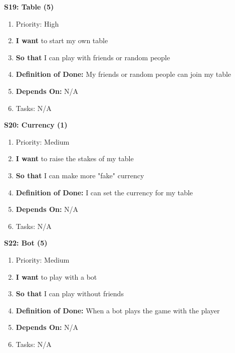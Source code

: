 \textbf{S19: Table (5)}
\begin{enumerate}
    \item Priority: High
    \item \textbf{I want} to start my own table 
    \item \textbf{So that} I can play with friends or random people
    \item \textbf{Definition of Done:} My friends or random people can join my table
    \item \textbf{Depends On:} N/A
    \item Tasks: N/A
\end{enumerate}


\textbf{S20: Currency (1)}
\begin{enumerate}
    \item Priority: Medium
    \item \textbf{I want} to raise the stakes of my table
    \item \textbf{So that} I can make more "fake" currency
    \item \textbf{Definition of Done:} I can set the currency for my table
    \item \textbf{Depends On:} N/A
    \item Tasks: N/A
\end{enumerate}


\textbf{S22: Bot (5)}
\begin{enumerate}
    \item Priority: Medium
    \item \textbf{I want} to play with a bot
    \item \textbf{So that} I can play without friends
    \item \textbf{Definition of Done:} When a bot plays the game with the player
    \item \textbf{Depends On:} N/A
    \item Tasks: N/A
\end{enumerate}



